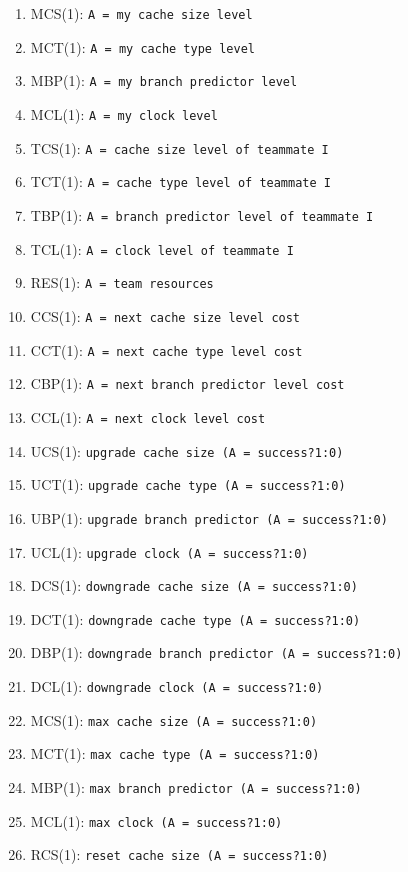 \documentclass{article}
\begin{document}
\begin{enumerate}[noitemsep]
    \item MCS(1): \texttt{A = my cache size level}
    \item MCT(1): \texttt{A = my cache type level}
    \item MBP(1): \texttt{A = my branch predictor level}
    \item MCL(1): \texttt{A = my clock level}
    \item TCS(1): \texttt{A = cache size level of teammate I}
    \item TCT(1): \texttt{A = cache type level of teammate I}
    \item TBP(1): \texttt{A = branch predictor level of teammate I}
    \item TCL(1): \texttt{A = clock level of teammate I}
    \item RES(1): \texttt{A = team resources}
    \item CCS(1): \texttt{A = next cache size level cost}
    \item CCT(1): \texttt{A = next cache type level cost}
    \item CBP(1): \texttt{A = next branch predictor level cost}
    \item CCL(1): \texttt{A = next clock level cost}
    \item UCS(1): \texttt{upgrade cache size (A = success?1:0)}
    \item UCT(1): \texttt{upgrade cache type (A = success?1:0)}
    \item UBP(1): \texttt{upgrade branch predictor (A = success?1:0)}
    \item UCL(1): \texttt{upgrade clock (A = success?1:0)}
    \item DCS(1): \texttt{downgrade cache size (A = success?1:0)}
    \item DCT(1): \texttt{downgrade cache type (A = success?1:0)}
    \item DBP(1): \texttt{downgrade branch predictor (A = success?1:0)}
    \item DCL(1): \texttt{downgrade clock (A = success?1:0)}
    \item MCS(1): \texttt{max cache size (A = success?1:0)}
    \item MCT(1): \texttt{max cache type (A = success?1:0)}
    \item MBP(1): \texttt{max branch predictor (A = success?1:0)}
    \item MCL(1): \texttt{max clock (A = success?1:0)}
    \item RCS(1): \texttt{reset cache size (A = success?1:0)}

\end{enumerate}
\end{document}
